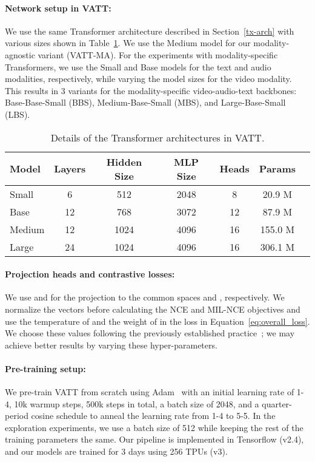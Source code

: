 \documentclass[10pt,twocolumn,letterpaper]{article}
\newcommand{\ours}{VATT\xspace}
\begin{document}
\paragraph{Network setup in \ours:} 
We use the same Transformer architecture described in Section~\ref{tx-arch} with various sizes shown in Table~\ref{table:arch-size}. We use the Medium model for our modality-agnostic variant (\ours-MA). For the experiments with modality-specific Transformers, we use the Small and Base models for the text and audio modalities, respectively, while varying the model sizes for the video modality. This results in 3 variants for the modality-specific video-audio-text backbones: Base-Base-Small (BBS), Medium-Base-Small (MBS), and Large-Base-Small (LBS).
\begin{table}[h!]
    \small
    \centering
    \setlength{\tabcolsep}{2pt}
    \begin{tabular}{@{}lcccccc@{}}
    \toprule
    Model & Layers & Hidden Size & MLP Size & Heads & Params \\
    \midrule
    Small & 6 & 512 & 2048 & 8 & 20.9 M \\
    Base & 12 & 768 & 3072 & 12 & 87.9 M \\
    Medium & 12 & 1024 & 4096 & 16 & 155.0 M \\
    Large & 24 & 1024 & 4096 & 16 & 306.1 M \\
    \bottomrule
    \end{tabular}
    \vspace{2mm}
    \caption{Details of the Transformer architectures in \ours.}
    \label{table:arch-size}
\end{table} 
\paragraph{Projection heads and contrastive losses:} 
We use  and  for the projection to the common spaces  and , respectively. We normalize the vectors before calculating the NCE and MIL-NCE objectives and use the temperature of  and the weight of  in the loss in Equation~\ref{eq:overall_loss}. We choose these values following the previously established practice~\cite{mmv}; we may achieve better results by varying these hyper-parameters.

\paragraph{Pre-training setup:} 
We pre-train \ours from scratch using Adam~\cite{kingma2014adam} with an initial learning rate of 1-4, 10k warmup steps, 500k steps in total, a batch size of 2048, and a quarter-period cosine schedule to anneal the learning rate from 1-4 to 5-5. In the exploration experiments, we use a batch size of 512 while keeping the rest of the training parameters the same. Our pipeline is implemented in Tensorflow (v2.4), and our models are trained for 3 days using 256 TPUs (v3).
\end{document}
